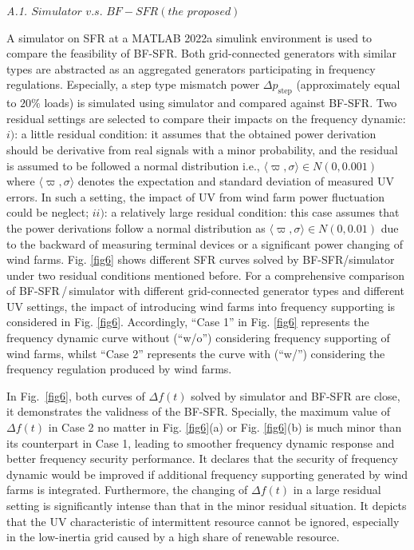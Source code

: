 \documentclass[lettersize,journal]{IEEEtran}
\begin{document}
\vspace{-0.25em}
\textit{A.1. $Simulator \,\,v.s.\,\, BF\!-\!SFR(the \,\,proposed)$}

A simulator on SFR at a MATLAB 2022a simulink environment is used to compare the feasibility of BF-SFR. Both grid-connected generators with similar types are abstracted as an aggregated generators participating in frequency regulations.  Especially, a step type mismatch power $\varDelta p_{\textrm{step}}$ (approximately equal to $20\%$ loads) is simulated using simulator and compared against BF-SFR.
Two residual settings are selected to compare their impacts on the frequency dynamic: $i)$: a little residual condition: it assumes that the obtained power derivation should be derivative from real signals with a minor probability, and the residual is assumed to be followed a normal distribution i.e., $\langle\varpi,\sigma\rangle\!\in\! N(0,0.001)$ where $\langle\varpi,\sigma\rangle$ denotes the expectation and standard deviation of measured UV errors. In such a setting, the impact of UV from wind farm power fluctuation could be neglect; $ii)$: a relatively large residual condition: this case assumes that the power derivations follow a normal distribution as $\langle\varpi,\sigma\rangle\in N(0,0.01)$ due to the backward of measuring terminal devices or a significant power changing of wind farms. Fig. \ref{fig6} shows different SFR curves solved by BF-SFR/simulator under two residual conditions mentioned before. For a comprehensive comparison of BF-SFR\,/\,simulator with different grid-connected generator types and different UV settings, the impact of introducing wind farms into frequency supporting is considered in Fig. \ref{fig6}. Accordingly, ``Case 1'' in Fig. \ref{fig6} represents the frequency dynamic curve without (“{w/o}”) considering frequency supporting of wind farms, whilst ``Case 2'' represents the curve with (“{w/}”) considering the frequency regulation produced by wind farms.

In Fig.~\ref{fig6}, both curves of $\varDelta f (t)$ solved by simulator and BF-SFR are close, it demonstrates the validness of the BF-SFR. Specially, the maximum value of $\varDelta f (t)$ in Case 2 no matter in Fig. \ref{fig6}(a) or Fig. \ref{fig6}(b) is much minor than its counterpart in Case 1, leading to smoother frequency dynamic response and better frequency security performance. It declares that the security of frequency dynamic would be improved if additional frequency supporting generated by wind farms is integrated. Furthermore, the changing of $\varDelta f (t)$ in a large residual setting is significantly intense than that in the minor residual situation. It depicts that the UV characteristic of intermittent resource cannot be ignored, especially in the low-inertia grid caused by a high share of renewable resource.
\end{document}
